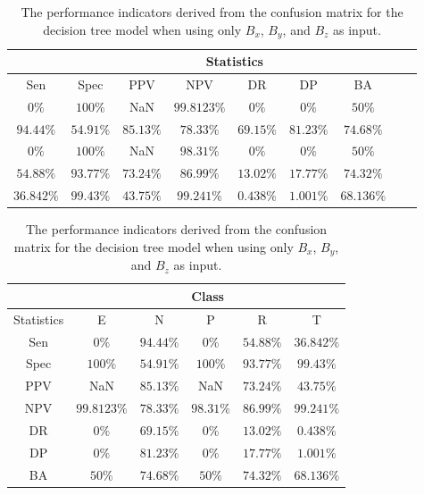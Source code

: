 \begin{table}[!ht]
	\centering
	\begin{tabular}{|c|c|c|c|c|c|c|c|c|}
		\hline
		 & \multicolumn{7}{c|}{Statistics} \\ \hline
		Sen & Spec & PPV & NPV & DR & DP & BA \\ \hline
		$0\%$ & $100\%$ & NaN & $99.8123\%$ & $0\%$ & $0\%$ & $50\%$ \\ \hline
		$94.44\%$ & $54.91\%$ & $85.13\%$ & $78.33\%$ & $69.15\%$ & $81.23\%$ & $74.68\%$ \\ \hline
		$0\%$ & $100\%$ & NaN & $98.31\%$ & $0\%$ & $0\%$ & $50\%$ \\ \hline
		$54.88\%$ & $93.77\%$ & $73.24\%$ & $86.99\%$ & $13.02\%$ & $17.77\%$ & $74.32\%$ \\ \hline
		$36.842\%$ & $99.43\%$ & $43.75\%$ & $99.241\%$ & $0.438\%$ & $1.001\%$ & $68.136\%$ \\ \hline
	\end{tabular}
	\caption{The performance indicators derived from the confusion matrix for the decision tree model when using only $B_{x}$, $B_{y}$, and $B_{z}$ as input.}
	\label{tab:cs:coord:C5.0}
\end{table}

\begin{table}[!ht]
	\centering
	\begin{tabular}{|c|c|c|c|c|c|}
		\hline
		 & \multicolumn{5}{c|}{Class} \\ \hline
		Statistics & E & N & P & R & T \\ \hline
		Sen & $0\%$ & $94.44\%$ & $0\%$ & $54.88\%$ & $36.842\%$ \\ \hline
		Spec & $100\%$ & $54.91\%$ & $100\%$ & $93.77\%$ & $99.43\%$ \\ \hline
		PPV & NaN & $85.13\%$ & NaN & $73.24\%$ & $43.75\%$ \\ \hline
		NPV & $99.8123\%$ & $78.33\%$ & $98.31\%$ & $86.99\%$ & $99.241\%$ \\ \hline
		DR & $0\%$ & $69.15\%$ & $0\%$ & $13.02\%$ & $0.438\%$ \\ \hline
		DP & $0\%$ & $81.23\%$ & $0\%$ & $17.77\%$ & $1.001\%$ \\ \hline
		BA & $50\%$ & $74.68\%$ & $50\%$ & $74.32\%$ & $68.136\%$ \\ \hline
	\end{tabular}
	\caption{The performance indicators derived from the confusion matrix for the decision tree model when using only $B_{x}$, $B_{y}$, and $B_{z}$ as input.}
	\label{tab:cs:reverse:coord:C5.0}
\end{table}


